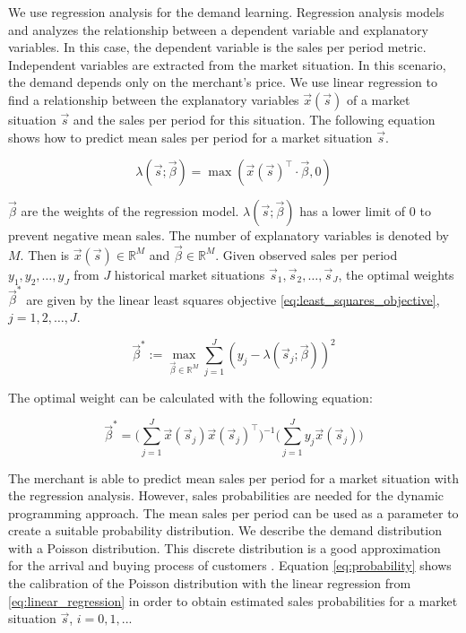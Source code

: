 We use regression analysis for the demand learning.
Regression analysis models and analyzes the relationship between a dependent variable and explanatory variables.
In this case, the dependent variable is the sales per period metric.
Independent variables are extracted from the market situation.
In this scenario, the demand depends only on the merchant's price.
We use linear regression to find a relationship between the explanatory variables $\vec{x}(\vec{s})$ of a market situation $\vec{s}$ and the sales per period for this situation.
The following equation shows how to predict mean sales per period for a market situation $\vec{s}$.

\begin{equation}
\label{eq:linear_regression}
\lambda(\vec{s}; \vec{\beta}) = \max(\vec{x}(\vec{s})^\intercal \cdot \vec{\beta}, 0)
\end{equation}

$\vec{\beta}$ are the weights of the regression model.
$\lambda(\vec{s}; \vec{\beta})$ has a lower limit of 0 to prevent negative mean sales.
The number of explanatory variables is denoted by $M$.
Then is $\vec{x}(\vec{s}) \in \mathbb{R}^M$ and $\vec{\beta} \in \mathbb{R}^M$.
Given observed sales per period $y_1, y_2, \ldots, y_J$ from $J$ historical market situations $\vec{s}_1, \vec{s}_2, \ldots, \vec{s}_J$, the optimal weights $\vec{\beta}^*$ are given by the linear least squares objective \cref{eq:least_squares_objective}, $j=1, 2, \ldots, J$.

\begin{equation}
\vec{\beta}^* := \max_{\vec{\beta} \in \mathbb{R}^M}{\sum_{j=1}^J
	{(y_j - \lambda(\vec{s}_j; \vec{\beta}))^2}
}
\label{eq:least_squares_objective}
\end{equation}

The optimal weight can be calculated with the following equation:

\begin{equation}
\vec{\beta}^* = \bigg(\sum_{j=1}^J{\vec{x}(\vec{s}_j) \vec{x}(\vec{s}_j)^\intercal} \bigg)^{-1}
			  \bigg(\sum_{j=1}^J{y_j \vec{x}(\vec{s}_j)} \bigg)
\end{equation}

The merchant is able to predict mean sales per period for a market situation with the regression analysis.
However, sales probabilities are needed for the dynamic programming approach.
The mean sales per period can be used as a parameter to create a suitable probability distribution.
We describe the demand distribution with a Poisson distribution.
This discrete distribution is a good approximation for the arrival and buying process of customers \cite{DBLP:journals/ior/Wolff82}.
Equation \cref{eq:probability} shows the calibration of the Poisson distribution with the linear regression from \cref{eq:linear_regression} in order to obtain estimated sales probabilities for a market situation $\vec{s}$, $i = 0,1,...$

